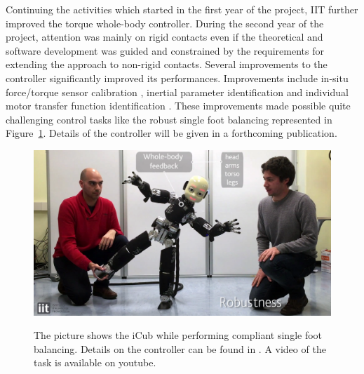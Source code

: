 Continuing the activities which started in the first year of the project, IIT further improved the torque whole-body controller. During the second year of the project, attention was mainly on rigid contacts even if the theoretical and software development was guided and constrained by the requirements for extending the approach to non-rigid contacts. Several improvements to the controller significantly improved its performances. Improvements include in-situ force/torque sensor calibration \cite{Traversaro2015b}, inertial parameter identification \cite{Traversaro2015} and individual motor transfer function identification \cite{Nori2015a}. These improvements made possible quite challenging control tasks like the robust single foot balancing represented in Figure~\ref{fig:footBalancing}. Details of the controller will be given in a forthcoming publication.\\

\begin{figure}[h!]
\centering
{\includegraphics[width=\linewidth]{images/single_foot_balancing.jpg}}
\caption{The picture shows the iCub while performing compliant single foot balancing. Details on the controller can be found in \cite{Nori2015a}. A video of the task is available on youtube\protect\footnotemark.}
\label{fig:footBalancing}
\end{figure}



